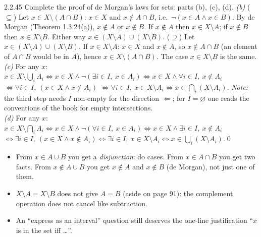 \begin{bookex}[recommended]{2.2.45}
Complete the proof of de Morgan's laws for sets: parts (b), (c), (d).
\solution
\emph{(b)} ($\subseteq$) Let $x\in X\setminus(A\cap B)$: $x\in X$ and $x\notin A\cap B$, i.e.\ $\neg(x\in A\wedge x\in B)$. By de Morgan (Theorem 1.3.24(a)), $x\notin A$ or $x\notin B$. If $x\notin A$ then $x\in X\setminus A$; if $x\notin B$ then $x\in X\setminus B$. Either way $x\in(X\setminus A)\cup(X\setminus B)$. ($\supseteq$) Let $x\in(X\setminus A)\cup(X\setminus B)$. If $x\in X\setminus A$: $x\in X$ and $x\notin A$, so $x\notin A\cap B$ (an element of $A\cap B$ would be in $A$), hence $x\in X\setminus(A\cap B)$. The case $x\in X\setminus B$ is the same.\\
\emph{(c)} For any $x$: $x\in X\setminus\bigcup_iA_i\Leftrightarrow x\in X\wedge\neg(\exists i\in I,\ x\in A_i)\Leftrightarrow x\in X\wedge\forall i\in I,\ x\notin A_i$  $\Leftrightarrow\forall i\in I,\ (x\in X\wedge x\notin A_i)$  $\Leftrightarrow\forall i\in I,\ x\in X\setminus A_i\Leftrightarrow x\in\bigcap_i(X\setminus A_i)$. \emph{Note:} the third step needs $I$ non-empty for the direction $\Leftarrow$; for $I=\varnothing$ one reads the conventions of the book for empty intersections.\\
\emph{(d)} For any $x$: $x\in X\setminus\bigcap_iA_i\Leftrightarrow x\in X\wedge\neg(\forall i\in I,\ x\in A_i)\Leftrightarrow x\in X\wedge\exists i\in I,\ x\notin A_i$  $\Leftrightarrow\exists i\in I,\ (x\in X\wedge x\notin A_i)\Leftrightarrow\exists i\in I,\ x\in X\setminus A_i\Leftrightarrow x\in\bigcup_i(X\setminus A_i)$.\qed
\end{bookex}

\begin{warn}
\begin{itemize}
\item From $x\in A\cup B$ you get a \emph{disjunction}: do cases. From $x\in A\cap B$ you get two facts. From $x\notin A\cup B$ you get $x\notin A$ and $x\notin B$ (de Morgan), not just one of them.
\item $X\setminus A=X\setminus B$ does not give $A=B$ (aside on page 91): the complement operation does not cancel like subtraction.
\item An ``express as an interval'' question still deserves the one-line justification ``$x$ is in the set iff \dots''.
\end{itemize}
\end{warn}

